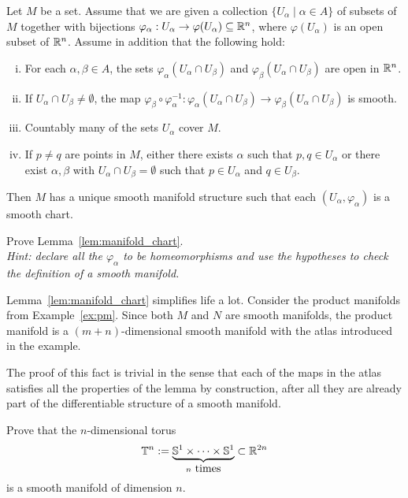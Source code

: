 \begin{lemma}\label{lem:manifold_chart}
  Let $M$ be a set. Assume that we are given a collection $\{U_\alpha\mid \alpha\in A\}$ of subsets of $M$ together with bijections $\varphi_\alpha: U_\alpha\to\varphi(U_\alpha)\subseteq\mathbb{R}^n$, where $\varphi(U_\alpha)$ is an open subset of $\mathbb{R}^n$. Assume in addition that the following hold:
  \begin{enumerate}[(i)]
    \item For each $\alpha, \beta \in A$, the sets $\varphi_\alpha(U_\alpha \cap U_\beta)$ and $\varphi_\beta(U_\alpha \cap U_\beta)$ are open in $\mathbb{R}^n$.
    \item If $U_\alpha \cap U_\beta \neq \emptyset$, the map $\varphi_\beta\circ\varphi_\alpha^{-1}: \varphi_\alpha(U_\alpha \cap U_\beta)\to \varphi_\beta(U_\alpha \cap U_\beta)$ is smooth.
    \item Countably many of the sets $U_\alpha$ cover $M$.
    \item If $p\neq q$ are points in $M$, either there exists $\alpha$ such that $p,q\in U_\alpha$ or there exist $\alpha,\beta$ with $U_\alpha\cap U_\beta=\emptyset$ such that $p\in U_\alpha$ and $q\in U_\beta$.
  \end{enumerate}
  Then $M$ has a unique smooth manifold structure such that each $(U_\alpha,\varphi_\alpha)$ is a smooth chart.
\end{lemma}
\begin{exercise}
  Prove Lemma~\ref{lem:manifold_chart}.\\
  \textit{\small Hint: declare all the $\varphi_\alpha$ to be homeomorphisms and use the hypotheses to check the definition of a smooth manifold.}
\end{exercise}

\begin{example}
  Lemma~\ref{lem:manifold_chart} simplifies life a lot.
  Consider the product manifolds from Example~\ref{ex:pm}.
  Since both $M$ and $N$ are smooth manifolds, the product manifold is a $(m+n)$-dimensional smooth manifold with the atlas introduced in the example.
  
  The proof of this fact is trivial in the sense that each of the maps in the atlas satisfies all the properties of the lemma by construction, after all they are already part of the differentiable structure of a smooth manifold.
\end{example}

\begin{exercise}
  Prove that the $n$-dimensional torus
  \begin{equation}
    \bT^n := \LaTeXunderbrace{\bS^1\times\cdots\times\bS^1}_{n\mbox{ times}} \subset \R^{2n}
  \end{equation}
  is a smooth manifold of dimension $n$.
\end{exercise}

